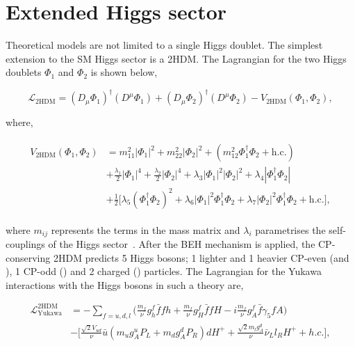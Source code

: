 \section{Extended Higgs sector}

Theoretical models are not limited to a single Higgs doublet.
The simplest extension to the \ac{SM} Higgs sector is a \ac{2HDM}.
The Lagrangian for the two Higgs doublets $\Phi_1$ and $\Phi_2$ is shown below,

\begin{equation}
\mathcal{L}_{\text{2HDM}} = (D_\mu \Phi_1)^{\dagger} (D^\mu \Phi_1) + (D_\mu \Phi_2)^{\dagger} (D^\mu \Phi_2) - V_{\text{2HDM}}(\Phi_1 ,\Phi_2),
\end{equation}

where,

\begin{align}
\label{eqn:lag_2hdm}
\begin{split}
V_{\text{2HDM}}(\Phi_{1},\Phi_{2}) &= m_{11}^{2}|\Phi_{1}|^2 + m_{22}^{2}|\Phi_{2}|^2 + (m_{12}^{2}\Phi_{1}^{\dagger}\Phi_{2} + \text{h.c.}) \\
&+ \frac{\lambda_1}{2}|\Phi_{1}|^4 + \frac{\lambda_2}{2}|\Phi_{2}|^4 + \lambda_3 |\Phi_{1}|^2 |\Phi_{2}|^2 + \lambda_4  |\Phi_{1}^{\dagger} \Phi_{2}| \\
&+ \frac{1}{2}\Big[ \lambda_5 (\Phi_{1}^{\dagger} \Phi_{2})^{2} + \lambda_6 |\Phi_{1}|^{2} \Phi_{1}^{\dagger} \Phi_{2} +  \lambda_7 |\Phi_{2}|^{2} \Phi_{1}^{\dagger} \Phi_{2} + \text{h.c.} \Big],
\end{split}
\end{align}

where $m_{ij}$ represents the terms in the mass matrix and $\lambda_i$ parametrises the self-couplings of the Higgs sector~\cite{Branco:2011iw}. 
After the \ac{BEH} mechanism is applied, the CP-conserving \ac{2HDM} predicts 5 Higgs bosons; 1 lighter and 1 heavier \ac{CP}-even (\Ph and \PH), 1 \ac{CP}-odd (\PA) and 2 charged (\PHc) particles.
The Lagrangian for the Yukawa interactions with the Higgs bosons in such a theory are,

\begin{equation}
\begin{aligned}
\mathcal{L}^{\text{2HDM}}_{\text{Yukawa}} &= - \sum_{f=u,d,l}\Big(\frac{m_{f}}{\nu}g^{f}_{h}\bar{f}fh + \frac{m_{f}}{\nu}g^{f}_{H}\bar{f}fH -i\frac{m_{f}}{\nu}g^{f}_{A}\bar{f}\gamma_{5}fA\Big)  \\ 
&- \Big[\frac{\sqrt{2}V_{ud}}{\nu}\bar{u}(m_{u}g^{u}_{A}P_{L} + m_{d}g^{d}_{A}P_{R})dH^{+} + \frac{\sqrt{2}m_{l}g^{d}_{A}}{\nu}\bar{\nu}_{L}l_{R}H^{+} + h.c.\Big],
\end{aligned}
\end{equation}


